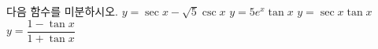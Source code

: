 다음 함수를 미분하시오.
 $y=\sec x-\sqrt{5}\csc x$
 $y=5e^x\tan x$
 $y=\sec x\tan x$
 $y=\dfrac{1-\tan x}{1+\tan x}$
